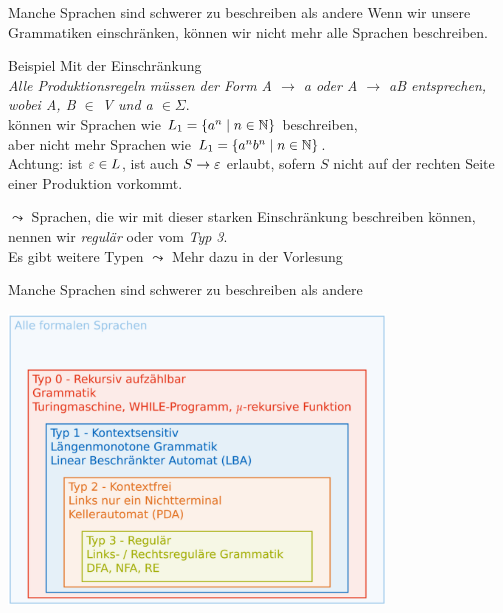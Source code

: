 \begin{frame}[fragile]{Manche Sprachen sind schwerer zu beschreiben als andere}
    Wenn wir unsere Grammatiken einschränken, können wir nicht mehr alle Sprachen beschreiben.
    \begin{exampleblock}{Beispiel}
        Mit der Einschränkung\\
        \emph{Alle Produktionsregeln müssen der Form \alert{A $\to$ a oder A $\to$ aB} entsprechen, wobei A, B $\in$ V und a $\in \Sigma$}.\\
        können wir Sprachen wie $L_1 = \{a^n \mid n \in \mathbb{N}\}$ beschreiben,\\ aber nicht mehr Sprachen wie $L_1 = \{a^nb^n \mid n \in \mathbb{N}\}$.\\
        \alert{Achtung:} ist $\varepsilon \in L$, ist auch $S\to\varepsilon$ erlaubt, sofern $S$ nicht auf der rechten Seite einer Produktion vorkommt.
    \end{exampleblock}
    $\leadsto$ Sprachen, die wir mit dieser starken Einschränkung beschreiben können, nennen wir \alert{\emph{regulär}} oder vom \alert{\emph{Typ 3}}.\\
    Es gibt weitere Typen $\leadsto$ Mehr dazu in der Vorlesung
\end{frame}

\begin{frame}[fragile]{Manche Sprachen sind schwerer zu beschreiben als andere}
    \begin{center}
        \includegraphics[width=0.75\textwidth]{../figures/Chomsky.png}
    \end{center}
\end{frame}

